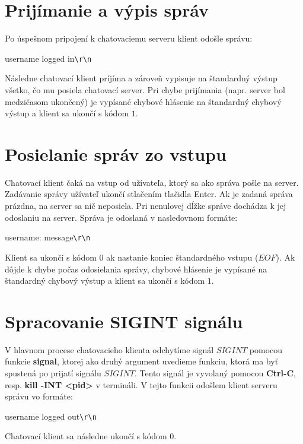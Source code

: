 \documentclass[10pt,a4paper]{article}
\begin{document}
\section{Prijímanie a výpis správ}
	Po úspešnom pripojení k chatovaciemu serveru klient odošle správu:
	\begin{framed}
	username logged in\texttt{\textbackslash{r}\textbackslash{n}}
	\end{framed}
	Následne chatovací klient príjíma a zároveň vypisuje na štandardný výstup všetko, čo mu posiela chatovací server. Pri chybe prijímania (napr. server bol medzičasom ukončený) je vypísané chybové hlásenie na štandardný chybový výstup a klient sa ukončí s kódom $1$.

\newpage

\section{Posielanie správ zo vstupu}
	Chatovací klient čaká na vstup od užívateľa, ktorý sa ako správa pošle na server. Zadávanie správy užívateľ ukončí stlačením tlačidla Enter. Ak je zadaná správa prázdna, na server sa nič neposiela. Pri nenulovej dĺžke správe dochádza k jej odoslaniu na server. Správa je odoslaná v nasledovnom formáte:
	\begin{framed}
	username: message\texttt{\textbackslash{r}\textbackslash{n}}
	\end{framed}
	
	Klient sa ukončí s kódom $0$ ak nastanie koniec štandardného vstupu ($EOF$). Ak dôjde k chybe počas odosielania správy, chybové hlásenie je vypísané na štandardný chybový výstup a klient sa ukončí s kódom $1$.
	
\section{Spracovanie SIGINT signálu}
	V hlavnom procese chatovacieho klienta odchytíme signál $SIGINT$ pomocou funkcie \textbf{signal}, ktorej ako druhý argument uvedieme funkciu, ktorá ma byť spustená po prijatí signálu $SIGINT$. Tento signál je vyvolaný pomocou \textbf{Ctrl-C}, resp. \textbf{kill -INT <pid>} v termináli. V tejto funkcii odošlem klient serveru správu vo formáte:
	\begin{framed}
	username logged out\texttt{\textbackslash{r}\textbackslash{n}}
	\end{framed}
	Chatovací klient sa následne ukončí s kódom $0$.
\end{document}
